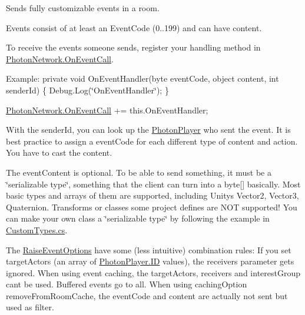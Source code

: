 Sends fully customizable events in a room. 

Events consist of at least an Event\+Code (0..199) and can have content. 

To receive the events someone sends, register your handling method in \hyperlink{class_photon_network_a81af9e901341d6b647df1f6d7f2d7583}{Photon\+Network.\+On\+Event\+Call}.

Example\+: private void On\+Event\+Handler(byte event\+Code, object content, int sender\+Id) \{ Debug.\+Log(\char`\"{}\+On\+Event\+Handler\char`\"{}); \}

\hyperlink{class_photon_network_a81af9e901341d6b647df1f6d7f2d7583}{Photon\+Network.\+On\+Event\+Call} += this.\+On\+Event\+Handler;

With the sender\+Id, you can look up the \hyperlink{class_photon_player}{Photon\+Player} who sent the event. It is best practice to assign a event\+Code for each different type of content and action. You have to cast the content.

The event\+Content is optional. To be able to send something, it must be a \char`\"{}serializable type\char`\"{}, something that the client can turn into a byte\mbox{[}\mbox{]} basically. Most basic types and arrays of them are supported, including Unity\textquotesingle{}s Vector2, Vector3, Quaternion. Transforms or classes some project defines are N\+OT supported! You can make your own class a \char`\"{}serializable type\char`\"{} by following the example in \hyperlink{_custom_types_8cs}{Custom\+Types.\+cs}.

The \hyperlink{class_raise_event_options}{Raise\+Event\+Options} have some (less intuitive) combination rules\+: If you set target\+Actors (an array of \hyperlink{class_photon_player_ac363d86e7c6ea63573e0ecfda7f7eaa7}{Photon\+Player.\+ID} values), the receivers parameter gets ignored. When using event caching, the target\+Actors, receivers and interest\+Group can\textquotesingle{}t be used. Buffered events go to all. When using caching\+Option remove\+From\+Room\+Cache, the event\+Code and content are actually not sent but used as filter. 


